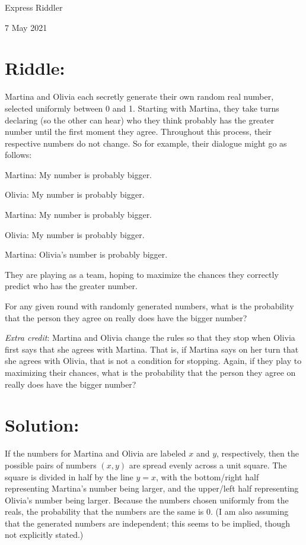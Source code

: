 \documentclass{article}
\begin{document}
\pagestyle{empty} %

\begin{center}
{\LARGE Express Riddler}

\vspace{0.15in}

{\Large 7 May 2021}
\end{center}


\section*{Riddle:}

Martina and Olivia each secretly generate their own random real number, selected uniformly between 0 and 1.
Starting with Martina, they take turns declaring (so the other can hear) who they think probably has the greater number until the first moment they agree.
Throughout this process, their respective numbers do not change.
So for example, their dialogue might go as follows:

Martina: My number is probably bigger.

Olivia: My number is probably bigger.

Martina: My number is probably bigger.

Olivia: My number is probably bigger.

Martina: Olivia's number is probably bigger.

They are playing as a team, hoping to maximize the chances they correctly predict who has the greater number.

For any given round with randomly generated numbers, what is the probability that the person they agree on really does have the bigger number?

\textit{Extra credit}: Martina and Olivia change the rules so that they stop when Olivia first says that she agrees with Martina.
That is, if Martina says on her turn that she agrees with Olivia, that is not a condition for stopping.
Again, if they play to maximizing their chances, what is the probability that the person they agree on really does have the bigger number?



\section*{Solution:}

If the numbers for Martina and Olivia are labeled $x$ and $y$, respectively, then the possible pairs of numbers $(x,y)$ are spread evenly across a unit square.
The square is divided in half by the line $y=x$, with the bottom/right half representing Martina's number being larger, and the upper/left half representing Olivia's number being larger.
Because the numbers chosen uniformly from the reals, the probability that the numbers are the same is 0.
(I am also assuming that the generated numbers are independent; this seems to be implied, though not explicitly stated.)
\end{document}
